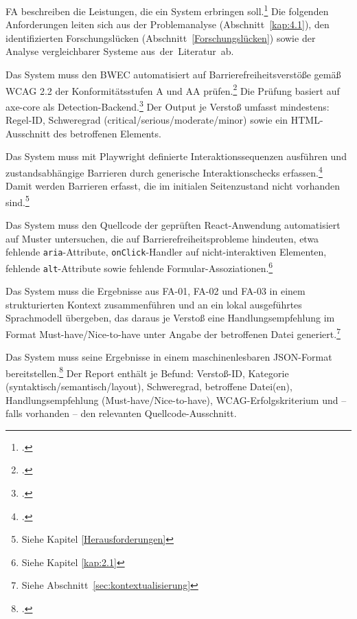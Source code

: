 \acf{FA} beschreiben die Leistungen, die ein System erbringen soll.\footcite[Vgl.][S. 105--107]{sommerville2016software} Die folgenden Anforderungen leiten sich aus der Problemanalyse (Abschnitt~\ref{kap:4.1}), den identifizierten Forschungslücken (Abschnitt~\ref{Forschungslücken}) sowie der Analyse vergleichbarer Systeme \mbox{aus der Literatur ab}.

\clearpage
{}

Das System muss den \ac{BWEC} automatisiert auf Barrierefreiheitsverstöße gemäß \ac{WCAG} 2.2 der Konformitätsstufen A und AA prüfen.\footcite[Vgl.][]{bwec,WCAG} Die Prüfung basiert auf axe-core als Detection-Backend.\footcite[Vgl.][]{axe} Der Output je Verstoß umfasst mindestens: Regel-ID, Schweregrad (critical/serious/moderate/minor) sowie ein \acs{HTML}-Ausschnitt des betroffenen Elements.


Das System muss mit Playwright definierte Interaktionssequenzen ausführen und zustandsabhängige Barrieren durch generische Interaktionschecks erfassen.\footcite[Vgl.][]{playwright} Damit werden Barrieren erfasst, die im initialen Seitenzustand nicht vorhanden sind.\footnote{Siehe Kapitel \ref{Herausforderungen}}


Das System muss den Quellcode der geprüften React-Anwendung automatisiert auf Muster untersuchen, die auf Barrierefreiheitsprobleme hindeuten, etwa fehlende \texttt{aria}-Attribute, \texttt{onClick}-Handler auf nicht-interaktiven Elementen, fehlende \texttt{alt}-Attribute sowie fehlende Formular-Assoziationen.\footnote{Siehe Kapitel \ref{kap:2.1}}


Das System muss die Ergebnisse aus \ac{FA}-01, \ac{FA}-02 und \ac{FA}-03 in einem strukturierten Kontext zusammenführen und an ein lokal ausgeführtes Sprachmodell übergeben, das daraus je Verstoß eine Handlungsempfehlung im Format Must-have/Nice-to-have unter Angabe der betroffenen Datei generiert.\footnote{Siehe Abschnitt~\ref{sec:kontextualisierung}}


Das System muss seine Ergebnisse in einem maschinenlesbaren \acs{JSON}-Format bereitstellen.\footcite[Vgl.][]{paterno_how_2025,pool_testaro_2023} Der Report enthält je Befund: Verstoß-ID, Kategorie (syntaktisch/semantisch/layout), Schweregrad, betroffene Datei(en), Handlungsempfehlung (Must-have/Nice-to-have), \ac{WCAG}-Erfolgskriterium und -- falls vorhanden -- den relevanten Quellcode-Ausschnitt.

